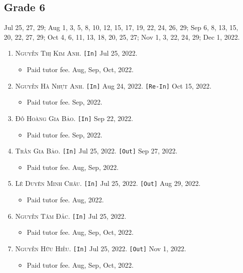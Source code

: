 \documentclass{article}
\numberwithin{equation}{section}
\begin{document}
\subsection{Grade 6}
Jul 25, 27, 29; Aug 1, 3, 5, 8, 10, 12, 15, 17, 19, 22, 24, 26, 29; Sep 6, 8, 13, 15, 20, 22, 27, 29; Oct 4, 6, 11, 13, 18, 20, 25, 27; Nov 1, 3, 22, 24, 29; Dec 1, 2022.
\begin{enumerate}
	\item \textsc{Nguyễn Thị Kim Anh.} \texttt{[In]} Jul 25, 2022.
	\begin{itemize}
		\item \textsf{Paid tutor fee.} Aug, Sep, Oct, 2022.
	\end{itemize}
	\item \textsc{Nguyễn Hà Nhựt Anh.} \texttt{[In]} Aug 24, 2022. \texttt{[Re-In]} Oct 15, 2022.
	\begin{itemize}
		\item \textsf{Paid tutor fee.} Sep, 2022.
	\end{itemize}
	\item \textsc{Đỗ Hoàng Gia Bảo.} \texttt{[In]} Sep 22, 2022.
	\begin{itemize}
		\item \textsf{Paid tutor fee.} Sep, 2022.
	\end{itemize}
	\item \textsc{Trần Gia Bảo.} \texttt{[In]} Jul 25, 2022. \texttt{[Out]} Sep 27, 2022.
	\begin{itemize}
		\item \textsf{Paid tutor fee.} Aug, Sep, 2022.
	\end{itemize}
	\item \textsc{Lê Duyên Minh Châu.} \texttt{[In]} Jul 25, 2022. \texttt{[Out]} Aug 29, 2022.
	\begin{itemize}
		\item \textsf{Paid tutor fee.} Aug, 2022.
	\end{itemize}
	\item \textsc{Nguyễn Tâm Đắc.} \texttt{[In]} Jul 25, 2022.
	\begin{itemize}
		\item \textsf{Paid tutor fee.} Aug, Sep, Oct, 2022.
	\end{itemize}
	\item \textsc{Nguyễn Hữu Hiếu.} \texttt{[In]} Jul 25, 2022. \texttt{[Out]} Nov 1, 2022.
	\begin{itemize}
		\item \textsf{Paid tutor fee.} Aug, Sep, Oct, 2022.
	\end{itemize}

\end{enumerate}
\end{document}
